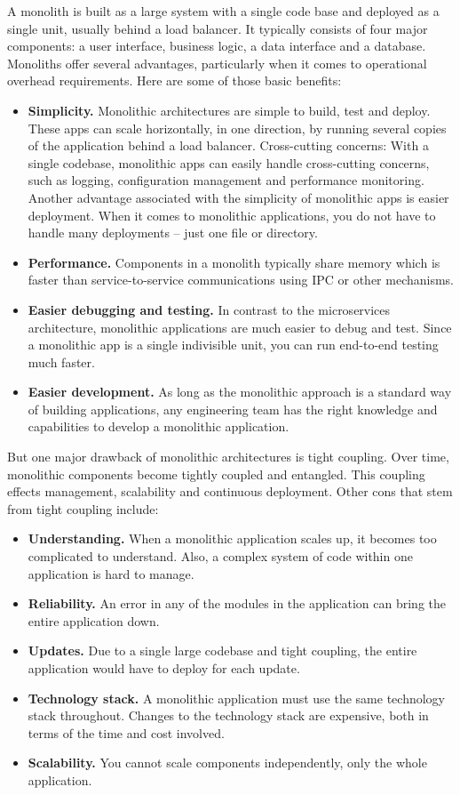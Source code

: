 A monolith is built as a large system with a single code base and deployed as a single unit, usually behind a load balancer.
It typically consists of four major components: a user interface, business logic, a data interface and a database.
Monoliths offer several advantages, particularly when it comes to operational overhead requirements.
Here are some of those basic benefits:

\begin{itemize}
    \item \textbf{Simplicity.} Monolithic architectures are simple to build, test and deploy.
    These apps can scale horizontally, in one direction, by running several copies of the application behind a load balancer.
    Cross-cutting concerns: With a single codebase, monolithic apps can easily handle cross-cutting concerns, such as logging,
    configuration management and performance monitoring.
    Another advantage associated with the simplicity of monolithic apps is easier deployment.
    When it comes to monolithic applications, you do not have to handle many deployments – just one file or directory.
    \item \textbf{Performance.} Components in a monolith typically share memory which is faster than service-to-service communications using
    IPC or other mechanisms.
    \item \textbf{Easier debugging and testing.}
    In contrast to the microservices architecture, monolithic applications are much easier to debug and test.
    Since a monolithic app is a single indivisible unit, you can run end-to-end testing much faster.
    \item \textbf{Easier development.} As long as the monolithic approach is a standard way of building applications,
    any engineering team has the right knowledge and capabilities to develop a monolithic application.
\end{itemize}
But one major drawback of monolithic architectures is tight coupling.
Over time, monolithic components become tightly coupled and entangled.
This coupling effects management, scalability and continuous deployment.
Other cons that stem from tight coupling include:

\begin{itemize}
    \item \textbf{Understanding.} When a monolithic application scales up, it becomes too complicated to understand.
    Also, a complex system of code within one application is hard to manage.
    \item \textbf{Reliability.} An error in any of the modules in the application can bring the entire application down.
    \item \textbf{Updates.} Due to a single large codebase and tight coupling, the entire application would have to deploy
    for each update.
    \item \textbf{Technology stack.} A monolithic application must use the same technology stack throughout.
    Changes to the technology stack are expensive, both in terms of the time and cost involved.
    \item \textbf{Scalability.} You cannot scale components independently, only the whole application.
\end{itemize}

